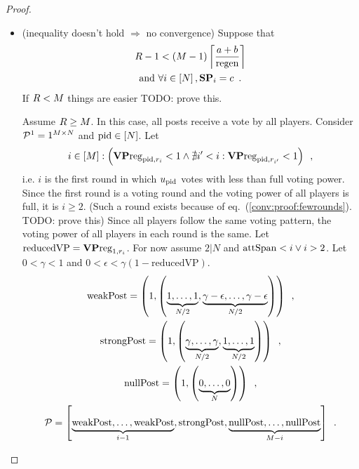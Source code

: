\begin{proof}
\begin{itemize}
    \item (inequality doesn't hold $\Rightarrow$ no convergence) Suppose that
    \begin{gather}
      \label{conv:proof:fewrounds}
      \rounds - 1 < \left(\postlen - 1\right)\ceil*{\frac{a+b}{\regen}} \\
      \text{and } \forall i \in \left[\playerlen\right], \stpowvec_i = c
      \enspace. \nonumber
    \end{gather}
    If $R < M$ things are easier TODO: prove this.

    Assume $R \geq M$. In this case, all posts receive a vote by
    all players. Consider $\mathcal{P}^1 = 1^{M \times N}$ and
    $\mathrm{pid} \in \left[N\right]$. Let
    \begin{equation*}
      i \in \left[M\right] :\left(\mathrm{\textbf{VP}reg}_{\mathrm{pid}, r_i} < 1
      \wedge \nexists i' < i: \mathrm{\textbf{VP}reg}_{\mathrm{pid}, r_{i'}} < 1\right)
      \enspace,
    \end{equation*}
    i.e. $i$ is the first round in which $u_{\mathrm{pid}}$ votes with less than full
    voting power. Since the first round is a voting round and the voting power
    of all players is full, it is $i \geq 2$. (Such a round exists because of
    eq.~(\ref{conv:proof:fewrounds}). TODO: prove this) Since all players follow
    the same voting pattern, the voting power of all players in each round is
    the same. Let $\mathrm{reducedVP} = \mathrm{\textbf{VP}reg}_{1, r_i}$. For now
    assume $2 | N$ and $\mathrm{attSpan} < i \vee i > 2$. Let $0 < \gamma < 1$ and $0 <
    \epsilon < \gamma\left(1 - \mathrm{reducedVP}\right)$.
    \begin{gather*}
      \mathrm{weakPost} = \left(1, \left(\underbrace{1, \dots,
      1}_{N/2}, \underbrace{\gamma - \epsilon, \dots, \gamma -
      \epsilon}_{N/2}\right)\right) \enspace, \\
      \mathrm{strongPost} = \left(1, \left(\underbrace{\gamma, \dots,
      \gamma}_{N/2}, \underbrace{1, \dots,
      1}_{N/2}\right)\right) \enspace, \\
      \mathrm{nullPost} = \left(1, \left(\underbrace{0, \dots,
      0}_{N}\right)\right) \enspace, \\
      \mathcal{P} = \left[\underbrace{\mathrm{weakPost}, \dots,
      \mathrm{weakPost}}_{i - 1}, \mathrm{strongPost},
      \underbrace{\mathrm{nullPost}, \dots, \mathrm{nullPost}}_{M -
      i}\right] \enspace.
    \end{gather*}


\end{itemize}
\end{proof}
